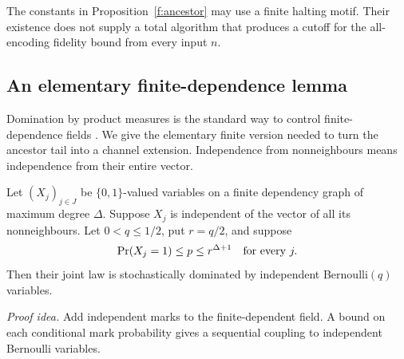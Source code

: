 The constants in Proposition~\ref{f:ancestor} may use a finite
halting motif. Their existence does not supply a total algorithm
that produces a cutoff for the all-encoding fidelity bound from every input \(n\).

\subsection{An elementary finite-dependence lemma}

Domination by product measures is the standard way to control finite-dependence fields \cite{LSS1997}. We give the elementary finite version needed to turn the ancestor tail into a channel extension. Independence from nonneighbours means
independence from their entire vector.

\begin{lemma}\label{f:domination}
Let \((X_j)_{j\in J}\) be \(\{0,1\}\)-valued variables on a finite
dependency graph of maximum degree \(\Delta\). Suppose \(X_j\) is
independent of the vector of all its nonneighbours. Let
\(0<q\le1/2\), put \(r=q/2\), and suppose
\[
 \Pr(X_j=1)\le p\le r^{\Delta+1}
 \quad\hbox{for every }j.
\]
Then their joint law is stochastically dominated by independent
Bernoulli\((q)\) variables.
\end{lemma}
\par\noindent\emph{Proof idea.} Add independent marks to the finite-dependent field. A bound on each conditional mark probability gives a sequential coupling to independent Bernoulli variables.

